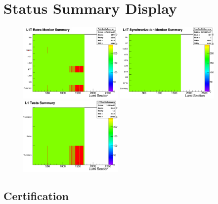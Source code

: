 \section{Status Summary Display}


\begin{figure}[!htb]
\centering
\includegraphics[width=0.45\textwidth]{Chapter03/L1TOnline/Images/RateQualitySummary.png} 
\includegraphics[width=0.45\textwidth]{Chapter03/L1TOnline/Images/SyncQualitySummary.png} \\
\includegraphics[width=0.45\textwidth]{Chapter03/L1TOnline/Images/L1TQualitySummary.png}
\caption{}
\label{figure_ServiceWork_StatusSummary}
\end{figure}

\subsection{Certification}


